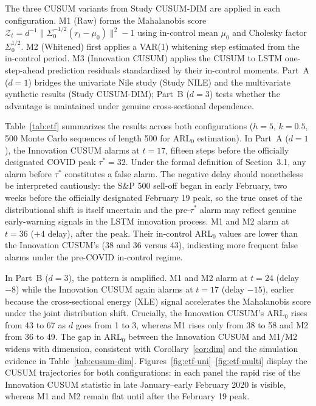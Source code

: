\documentclass[bj,authoryear]{imsart}
\theoremstyle{plain}
\theoremstyle{definition}
\begin{document}
The three CUSUM variants from Study CUSUM-DIM are applied in each configuration.
M1 (Raw) forms the Mahalanobis score
$\mathcal{Z}_t = d^{-1}\|\Sigma_0^{-1/2}(r_t - \mu_0)\|^2 - 1$
using in-control mean $\mu_0$ and Cholesky factor $\Sigma_0^{1/2}$.
M2 (Whitened) first applies a VAR(1) whitening step estimated from the
in-control period.  M3 (Innovation CUSUM) applies the CUSUM to LSTM one-step-ahead
prediction residuals standardized by their in-control moments.
Part~A ($d=1$) bridges the univariate Nile study (Study NILE) and the
multivariate synthetic results (Study CUSUM-DIM); Part~B ($d=3$) tests whether the
advantage is maintained under genuine cross-sectional dependence.

Table~\ref{tab:etf} summarizes the results across both configurations
($h=5$, $k=0.5$, 500 Monte Carlo sequences of length 500 for ARL$_0$
estimation).  In Part~A ($d=1$), the Innovation CUSUM alarms at $t=17$, fifteen steps
before the officially designated COVID peak $\tau^*=32$.
Under the formal definition of Section~3.1, any alarm before $\tau^*$ constitutes a false alarm.
The negative delay should nonetheless be interpreted cautiously: the S\&P 500 sell-off began in early February, two weeks before the officially designated February 19 peak, so the true onset of the distributional shift is itself uncertain and the pre-$\tau^*$ alarm may reflect genuine early-warning signals in the LSTM innovation process.  M1 and M2 alarm at $t=36$
($+4$ delay), after the peak.
Their in-control ARL$_0$ values are lower than the Innovation CUSUM's (38 and 36
versus 43), indicating more frequent false alarms under the pre-COVID
in-control regime.

In Part~B ($d=3$), the pattern is amplified.  M1 and M2 alarm at $t=24$
(delay $-8$) while the Innovation CUSUM again alarms at $t=17$ (delay $-15$), earlier
because the cross-sectional energy (XLE) signal accelerates the Mahalanobis
score under the joint distribution shift.  Crucially, the Innovation CUSUM's ARL$_0$
rises from 43 to 67 as $d$ goes from 1 to 3, whereas M1 rises only from 38
to 58 and M2 from 36 to 49.  The gap in ARL$_0$ between the Innovation CUSUM and M1/M2
widens with dimension, consistent with Corollary~\ref{cor:dim} and the
simulation evidence in Table~\ref{tab:cusum-dim}.
Figures~\ref{fig:etf-uni}--\ref{fig:etf-multi} display the CUSUM trajectories for
both configurations: in each panel the rapid rise of the Innovation CUSUM statistic
in late January--early February 2020 is visible, whereas M1 and M2 remain
flat until after the February 19 peak.
\end{document}
